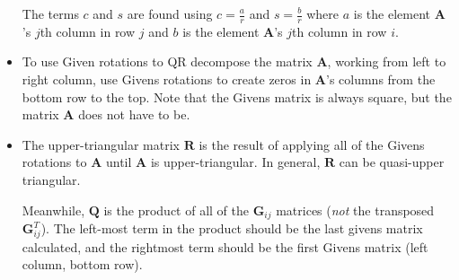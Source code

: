 \documentclass[11pt, a4paper]{article}
\newcommand{\mat}[1]{\mathbf{#1}} %
\begin{document}
\begin{itemize}
	The terms $ c $ and $ s $ are found using $ c = \frac{a}{r} $ and $ s = \frac{b}{r} $ where $ a $ is the element $ \mat{A} $'s $ j $th column in row $ j $ and $ b $ is the element $ \mat{A} $'s $ j $th column in row $ i $.
	
	\item To use Given rotations to QR decompose the matrix $ \mat{A} $, working from left to right column, use Givens rotations to create zeros in $ \mat{A} $'s columns from the bottom row to the top. Note that the Givens matrix is always square, but the matrix $ \mat{A} $ does not have to be.
	
	\item The upper-triangular matrix $ \mat{R} $ is the result of applying all of the Givens rotations to $ \mat{A} $ until $ \mat{A} $ is upper-triangular. In general, $ \mat{R} $ can be quasi-upper triangular. 
	
	Meanwhile, $ \mat{Q} $ is the product of all of the $ \mat{G}_{ij} $ matrices (\textit{not} the transposed $ \mat{G}_{ij}^{T} $). The left-most term in the product should be the last givens matrix calculated, and the rightmost term should be the first Givens matrix (left column, bottom row).
\end{itemize}
\end{document}
